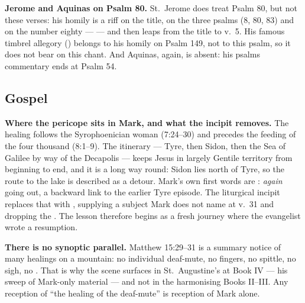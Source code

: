 \textbf{Jerome and Aquinas on Psalm 80.} St.~Jerome does treat Psalm 80, but not
these verses: his homily is a riff on the title, on the three
 psalms (8, 80, 83) and on the number eighty ---
 --- and then leaps from the title to v.~5.
His famous timbrel allegory () belongs to his homily on Psalm 149, not to this
psalm, so it does not bear on this chant. And Aquinas, again, is absent: his psalms
commentary ends at Psalm 54.

\elementguard
\subsection*{Gospel }


\textbf{Where the pericope sits in Mark, and what the incipit removes.} The
healing follows the Syrophoenician woman (7:24--30) and precedes the feeding of
the four thousand (8:1--9). The itinerary --- Tyre, then Sidon, then the Sea of
Galilee by way of the Decapolis --- keeps Jesus in largely Gentile territory
from beginning to end, and it is a long way round: Sidon lies north of Tyre, so
the route to the lake is described as a detour. Mark's own first words are
: \textit{again} going out, a backward link to the
earlier Tyre episode. The liturgical incipit replaces that with , supplying a subject Mark does not name at v.~31 and
dropping the . The lesson therefore begins as a fresh journey
where the evangelist wrote a resumption.

\textbf{There is no synoptic parallel.} Matthew 15:29--31 is a summary notice
of many healings on a mountain: no individual deaf-mute, no fingers, no
spittle, no sigh, no . That is why the scene surfaces in
St.~Augustine's  at Book IV --- his sweep of
Mark-only material --- and not in the harmonising Books II--III. Any reception
of ``the healing of the deaf-mute'' is reception of Mark alone.

